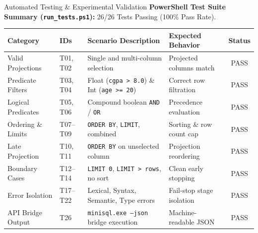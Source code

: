\documentclass[aspectratio=169,10pt]{beamer}
\begin{document}
\begin{frame}{Automated Testing \& Experimental Validation}
    \textbf{PowerShell Test Suite Summary (\texttt{run\_tests.ps1}):} 26/26 Tests Passing (100\% Pass Rate).
    \vspace{0.4em}
    \begin{table}\footnotesize
    \begin{tabularx}{\textwidth}{l l p{4.6cm} p{3.2cm} c}
        \toprule
        \textbf{Category} & \textbf{IDs} & \textbf{Scenario Description} & \textbf{Expected Behavior} & \textbf{Status} \\
        \midrule
        Valid Projections & T01, T02 & Single and multi-column selection & Projected columns match & PASS \\
        Predicate Filters & T03, T04 & Float (\texttt{cgpa > 8.0}) \& Int (\texttt{age >= 20}) & Correct row filtration & PASS \\
        Logical Predicates & T05, T06 & Compound boolean \texttt{AND} / \texttt{OR} & Precedence evaluation & PASS \\
        Ordering \& Limits & T07--T09 & \texttt{ORDER BY}, \texttt{LIMIT}, combined & Sorting \& row count cap & PASS \\
        Late Projection & T10, T11 & \texttt{ORDER BY} on unselected column & Projection reordering & PASS \\
        Boundary Cases & T12--T14 & \texttt{LIMIT 0}, \texttt{LIMIT > rows}, no sort & Clean early stopping & PASS \\
        Error Isolation & T17--T22 & Lexical, Syntax, Semantic, Type errors & Fail-stop stage isolation & PASS \\
        API Bridge Output & T26 & \texttt{minisql.exe --json} bridge execution & Machine-readable JSON & PASS \\
        \bottomrule
    \end{tabularx}
    \end{table}
\end{frame}
\end{document}
